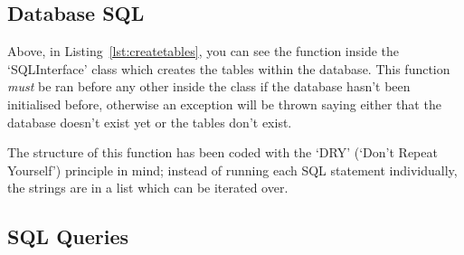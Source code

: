 \documentclass[12pt,a4paper]{report}
\begin{document}
        \newpage
        \subsection{Database SQL}

        
        Above, in Listing~\ref{lst:createtables}, you can see the function inside the `SQLInterface' class which creates the tables
        within the database. This function \textit{must} be ran before any other inside the class if the database
        hasn't been initialised before, otherwise an exception will be thrown saying either that the database 
        doesn't exist yet or the tables don't exist.

        The structure of this function has been coded with the `DRY' (`Don't Repeat Yourself') principle in mind;
        instead of running each SQL statement individually, the strings are in a list which can be iterated over.

    \subsection{SQL Queries}
\end{document}
